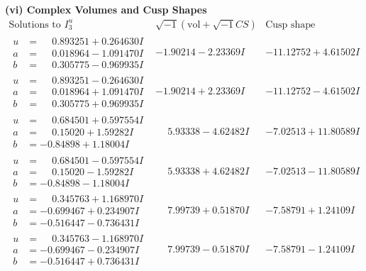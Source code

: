 \documentclass[1p]{elsarticle_modified}
\theoremstyle{definition}
\newcommand{\I}{\sqrt{-1}}
\begin{document}
\newpage\flushleft \textbf{(vi) Complex Volumes and Cusp Shapes}
$$\begin{array}{c|c|c}  
\text{Solutions to }I^u_{3}& \I (\text{vol} + \sqrt{-1}CS) & \text{Cusp shape}\\
 \hline 
\begin{aligned}
u &= \phantom{-}0.893251 + 0.264630 I \\
a &= \phantom{-}0.018964 - 1.091470 I \\
b &= \phantom{-}0.305775 - 0.969935 I\end{aligned}
 & -1.90214 - 2.23369 I & -11.12752 + 4.61502 I \\ \hline\begin{aligned}
u &= \phantom{-}0.893251 - 0.264630 I \\
a &= \phantom{-}0.018964 + 1.091470 I \\
b &= \phantom{-}0.305775 + 0.969935 I\end{aligned}
 & -1.90214 + 2.23369 I & -11.12752 - 4.61502 I \\ \hline\begin{aligned}
u &= \phantom{-}0.684501 + 0.597554 I \\
a &= \phantom{-}0.15020 + 1.59282 I \\
b &= -0.84898 + 1.18004 I\end{aligned}
 & \phantom{-}5.93338 - 4.62482 I & -7.02513 + 11.80589 I \\ \hline\begin{aligned}
u &= \phantom{-}0.684501 - 0.597554 I \\
a &= \phantom{-}0.15020 - 1.59282 I \\
b &= -0.84898 - 1.18004 I\end{aligned}
 & \phantom{-}5.93338 + 4.62482 I & -7.02513 - 11.80589 I \\ \hline\begin{aligned}
u &= \phantom{-}0.345763 + 1.168970 I \\
a &= -0.699467 + 0.234907 I \\
b &= -0.516447 - 0.736431 I\end{aligned}
 & \phantom{-}7.99739 + 0.51870 I & -7.58791 + 1.24109 I \\ \hline\begin{aligned}
u &= \phantom{-}0.345763 - 1.168970 I \\
a &= -0.699467 - 0.234907 I \\
b &= -0.516447 + 0.736431 I\end{aligned}
 & \phantom{-}7.99739 - 0.51870 I & -7.58791 - 1.24109 I \\ \hline\begin{aligned}

\end{aligned}
\end{array}$$
\end{document}
